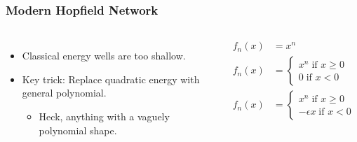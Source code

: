 \begin{frame}
	
    \frametitle{Modern Hopfield Network}
    \begin{columns}[c]
        \begin{itemize}
            \item Classical energy wells are too shallow.
            \item Key trick: Replace quadratic energy with general polynomial.
            \begin{itemize}
                \item Heck, anything with a vaguely polynomial shape.
            \end{itemize}
        \end{itemize}

        \begin{align*}
            f_n\left( x \right) &= x^n \\
            f_n\left( x \right) &= \begin{cases}
                x^n \; \text{if } x\geq0 \\
                0 \; \text{if } x<0
            \end{cases} \\
            f_n\left( x \right) &= \begin{cases}
                x^n \; \text{if } x\geq0 \\
                -\epsilon x \; \text{if } x<0
            \end{cases}
        \end{align*}


\end{columns}
\end{frame}

